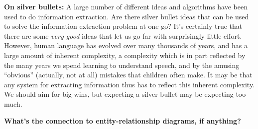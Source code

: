 \textbf{On silver bullets:} A large number of different ideas and
algorithms have been used to do information extraction.  Are there
silver bullet ideas that can be used to solve the information
extraction problem at one go?  It's certainly true that there are some
\emph{very good} ideas that let us go far with surprisingly little
effort.  However, human language has evolved over many thousands of
years, and has a large amount of inherent complexity, a complexity
which is in part reflected by the many years we spend learning to
understand speech, and by the amusing ``obvious'' (actually, not at
all) mistakes that children often make.  It may be that any system for
extracting information thus has to reflect this inherent complexity.
We should aim for big wins, but expecting a silver bullet may be
expecting too much.

\textbf{What's the connection to entity-relationship diagrams, if
  anything?}

